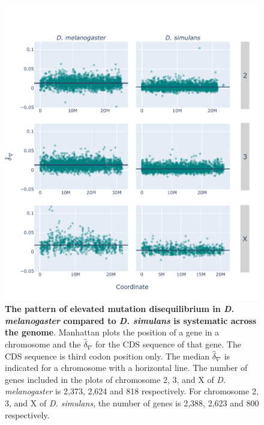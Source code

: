 \begin{figure}[htbp]
\centering
\includegraphics[width=\textwidth]{figures/plots/drosophila/d-conv_manhatten.pdf}
\caption{\textbf{The pattern of elevated mutation disequilibrium in \textit{D. melanogaster} compared to \textit{D. simulans} is systematic across the genome}. Manhattan plots the position of a gene in a chromosome and the $\hat\delta_\nabla$ for the CDS sequence of that gene. The CDS sequence is third codon position only. The median $\hat\delta_\nabla$ is indicated for a chromosome with a horizontal line. The number of genes included in the plots of chromosome 2, 3, and X of \textit{D. melanogaster} is 2,373, 2,624 and 818 respectively. For chromosome 2, 3, and X of \textit{D. simulans}, the number of genes is 2,388, 2,623 and 800 respectively.}
\label{fig:drosophila_d-conv_manhattan}
\end{figure}
